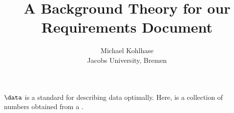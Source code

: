 \documentclass{article}
\title{A Background Theory for our Requirements Document}
\author{Michael Kohlhase\\Jacobs University, Bremen}
\begin{document}
\maketitle

\begin{module}[id=background]
  \begin{definition}
    $\data$ is a standard for describing data optimally. Here, {} is a
    collection of numbers obtained from a {}.
  \end{definition}
\end{module}
\end{document}
